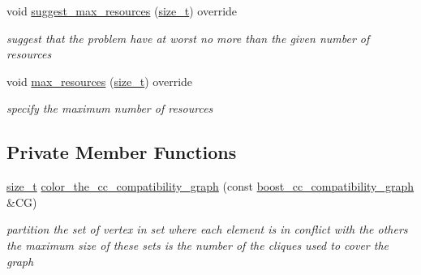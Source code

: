 \begin{DoxyCompactItemize}
void \hyperlink{classbipartite__matching__clique__covering_a80332109220a9bb4d8a599a5eed97c90}{suggest\+\_\+max\+\_\+resources} (\hyperlink{tutorial__fpt__2017_2intro_2sixth_2test_8c_a7c94ea6f8948649f8d181ae55911eeaf}{size\+\_\+t}) override
\begin{DoxyCompactList}\small\item\em suggest that the problem have at worst no more than the given number of resources \end{DoxyCompactList}\item 
void \hyperlink{classbipartite__matching__clique__covering_a94f457764eb9a86767f63a040b9dc2da}{max\+\_\+resources} (\hyperlink{tutorial__fpt__2017_2intro_2sixth_2test_8c_a7c94ea6f8948649f8d181ae55911eeaf}{size\+\_\+t}) override
\begin{DoxyCompactList}\small\item\em specify the maximum number of resources \end{DoxyCompactList}\end{DoxyCompactItemize}
\subsection*{Private Member Functions}
\begin{DoxyCompactItemize}
\item 
\hyperlink{tutorial__fpt__2017_2intro_2sixth_2test_8c_a7c94ea6f8948649f8d181ae55911eeaf}{size\+\_\+t} \hyperlink{classbipartite__matching__clique__covering_a371f3b2af258c516cb7c2c41b1a93a44}{color\+\_\+the\+\_\+cc\+\_\+compatibility\+\_\+graph} (const \hyperlink{clique__covering__graph_8hpp_af47b1c28cf9a2c360afafb8d80582ce6}{boost\+\_\+cc\+\_\+compatibility\+\_\+graph} \&CG)
\begin{DoxyCompactList}\small\item\em partition the set of vertex in set where each element is in conflict with the others the maximum size of these sets is the number of the cliques used to cover the graph \end{DoxyCompactList}\end{DoxyCompactItemize}
